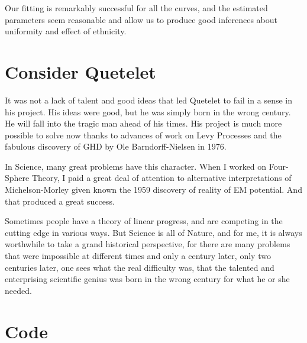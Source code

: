 \documentclass{amsart}
\begin{document}
Our fitting is remarkably successful for all the curves, and the estimated parameters seem reasonable and allow us to produce good inferences about uniformity and effect of ethnicity.

\section{Consider Quetelet}

It was not a lack of talent and good ideas that led Quetelet to fail in a sense in his project.  His ideas were good, but he was simply born in the wrong century.  He will fall into the tragic man ahead of his times.  His project is much more possible to solve now thanks to advances of work on Levy Processes and the fabulous discovery of GHD by Ole Barndorff-Nielsen in 1976.  

In Science, many great problems have this character.  When I worked on Four-Sphere Theory, I paid a great deal of attention to alternative interpretations of Michelson-Morley given known the 1959 discovery of reality of EM potential.  And that produced a great success.  

Sometimes people have a theory of linear progress, and are competing in the cutting edge in various ways.  But Science is all of Nature, and for me, it is always worthwhile to take a grand historical perspective, for there are many problems that were impossible at different times and only a century later, only two centuries later, one sees what the real difficulty was, that the talented and enterprising scientific genius was born in the wrong century for what he or she needed.  

\section{Code}
\end{document}
